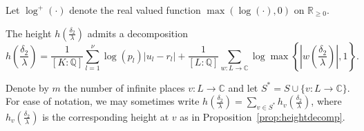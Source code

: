 Let $\log^+(\cdot)$ denote the real valued function $\max(\log(\cdot), 0)$ on $\mathbb{R}_{\geq 0}$. 

\begin{proposition}\label{prop:heightdecomp}
The height $h\left(\frac{\delta_2}{\lambda}\right)$ admits a decomposition
\[h\left(\frac{\delta_2}{\lambda}\right) = \frac{1}{[K:\mathbb{Q}]}\sum_{l = 1}^{\nu} \log(p_l)|u_l - r_l| + \frac{1}{[L:\mathbb{Q}]}\sum_{w :L \to \mathbb{C}} \log \max \left\{ \left|w\left(\frac{\delta_2}{\lambda}\right)\right|, 1\right\}.\]
\end{proposition}
Denote by $m$ the number of infinite places $v: L \to \mathbb{C}$ and let $S^* = S \cup \{v : L \to \mathbb{C}\}$. For ease of notation, we may sometimes write $h\left(\frac{\delta_2}{\lambda}\right) = \sum_{v\in S^*}h_v\left(\frac{\delta_2}{\lambda}\right)$, where $h_{v}\left(\frac{\delta_2}{\lambda}\right)$ is the corresponding height at $v$ as in Proposition~\ref{prop:heightdecomp}.

